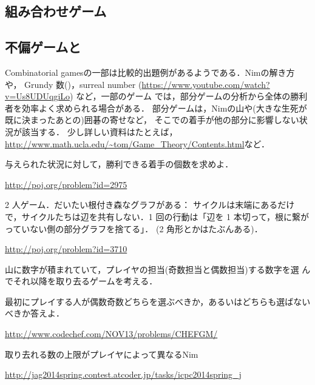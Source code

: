  \begin{versionalpha}
\chapter{組み合わせゲーム}



\section{不偏ゲームと}

Combinatorial gamesの一部は比較的出題例があるようである．Nimの解き方や，
Grundy 数(\pccbook[pp.~272-])，surreal number
(\url{https://www.youtube.com/watch?v=Us8UDUqgiLo}) など，一部のゲーム
では，部分ゲームの分析から全体の勝利者を効率よく求められる場合がある．
部分ゲームは，Nimの山や(大きな生死が既に決まったあとの)囲碁の寄せなど，
そこでの着手が他の部分に影響しない状況が該当する．
少し詳しい資料はたとえば，\url{http://www.math.ucla.edu/~tom/Game_Theory/Contents.html}など．

\begin{psbox}
与えられた状況に対して，勝利できる着手の個数を求めよ．
  
\url{http://poj.org/problem?id=2975}
\end{psbox}

\begin{pbox}

2 人ゲーム．だいたい根付き森なグラフがある： サイクルは末端にあるだけで，サイクルたちは辺を共有しない．1 回の行動は「辺を 1
本切って，根に繋がっていない側の部分グラフを捨てる」．
(2 角形とかはたぶんある)．

\url{http://poj.org/problem?id=3710} 
\end{pbox}

\begin{pbox}
山に数字が積まれていて，プレイヤの担当(奇数担当と偶数担当)する数字を選
んでそれ以降を取り去るゲームを考える．

最初にプレイする人が偶数奇数どちらを選ぶべきか，あるいはどちらも選ばないべきか答えよ．

\url{http://www.codechef.com/NOV13/problems/CHEFGM/}
\end{pbox}

\begin{pbox}
  取り去れる数の上限がプレイヤによって異なるNim

\url{http://jag2014spring.contest.atcoder.jp/tasks/icpc2014spring_j}
\end{pbox}


\end{versionalpha}
